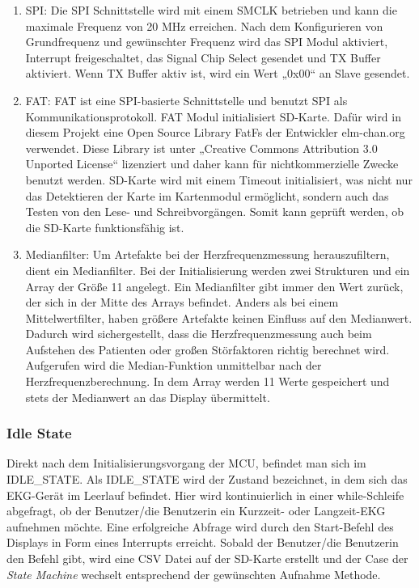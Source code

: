 \begin{enumerate}
    \item SPI: Die SPI Schnittstelle wird mit einem SMCLK betrieben und kann die maximale Frequenz von 20 MHz erreichen. Nach dem Konfigurieren von Grundfrequenz und gewünschter Frequenz wird das SPI Modul aktiviert, Interrupt freigeschaltet, das Signal Chip Select gesendet und TX Buffer aktiviert. Wenn TX Buffer aktiv ist, wird ein Wert „0x00“ an Slave gesendet. 
    \item FAT: FAT ist eine SPI-basierte Schnittstelle und benutzt SPI als Kommunikationsprotokoll. FAT Modul initialisiert SD-Karte. Dafür wird in diesem Projekt eine Open Source Library FatFs der Entwickler elm-chan.org verwendet. Diese Library ist unter „Creative Commons Attribution 3.0 Unported License“ lizenziert und daher kann für nichtkommerzielle Zwecke benutzt werden. 
    SD-Karte wird mit einem Timeout initialisiert, was nicht nur das Detektieren der Karte im Kartenmodul ermöglicht, sondern auch das Testen von den Lese- und Schreibvorgängen. Somit kann geprüft werden, ob die SD-Karte funktionsfähig ist.
    \item Medianfilter: Um Artefakte bei der Herzfrequenzmessung herauszufiltern, dient ein Medianfilter. Bei der Initialisierung werden zwei Strukturen und ein Array der Größe 11 angelegt. Ein Medianfilter gibt immer den Wert zurück, der sich in der Mitte des Arrays befindet. Anders als bei einem Mittelwertfilter, haben größere Artefakte keinen Einfluss auf den Medianwert. Dadurch wird sichergestellt, dass die Herzfrequenzmessung auch beim Aufstehen des Patienten oder großen Störfaktoren richtig berechnet wird. Aufgerufen wird die Median-Funktion unmittelbar nach der Herzfrequenzberechnung. In dem Array werden 11 Werte gespeichert und stets der Medianwert an das Display übermittelt.
\end{enumerate}

\subsubsection{Idle State}

Direkt nach dem Initialisierungsvorgang der MCU, befindet man sich im IDLE\_STATE. 
Als IDLE\_STATE wird der Zustand bezeichnet, in dem sich das EKG-Gerät im Leerlauf befindet. Hier wird kontinuierlich in einer while-Schleife abgefragt, ob der Benutzer/die Benutzerin ein Kurzzeit- oder Langzeit-EKG aufnehmen möchte.
Eine erfolgreiche Abfrage wird durch den Start-Befehl des Displays in Form eines Interrupts erreicht. Sobald der Benutzer/die Benutzerin den Befehl gibt, wird eine CSV Datei auf der SD-Karte erstellt und der Case der \textit{State Machine} wechselt entsprechend der gewünschten Aufnahme Methode.


